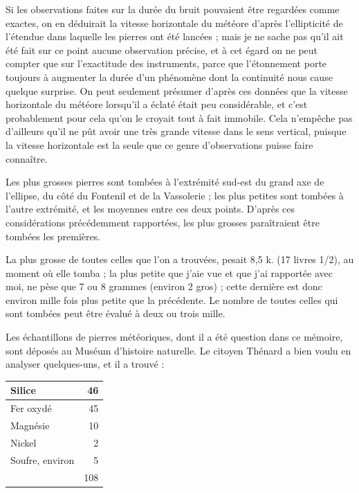 \documentclass[a4paper, 11pt, oneside, polutonikogreek, french]{article}
\begin{document}
Si les observations faites sur la durée du bruit pouvaient être regardées comme exactes, on en déduirait la vitesse horizontale du météore d'après l'ellipticité de l'étendue dans laquelle les pierres ont été lancées ; mais je ne sache pas qu'il ait été fait sur ce point aucune observation précise, et à cet égard on ne peut compter que sur l'exactitude des instruments, parce que l'étonnement porte toujours à augmenter la durée d'un phénomène dont la continuité nous cause quelque surprise. On peut seulement présumer d'après ces données que la vitesse horizontale du météore lorsqu'il a éclaté était peu considérable, et c'est probablement pour cela qu'on le croyait tout à fait immobile. Cela n'empêche pas d'ailleurs qu'il ne pût avoir une très grande vitesse dans le sens vertical, puisque la vitesse horizontale est la seule que ce genre d'observations puisse faire connaître.

Les plus grosses pierres sont tombées à l'extrémité sud-est du grand axe de l'ellipse, du côté du Fontenil et de la Vassolerie ; les plus petites sont tombées à l'autre extrémité, et les moyennes entre ces deux points. D'après ces considérations précédemment rapportées, les plus grosses paraîtraient être tombées les premières.

La plus grosse de toutes celles que l'on a trouvées, pesait 8,5 k. (17 livres 1/2), au moment où elle tomba ; la plus petite que j'aie vue et que j'ai rapportée avec moi, ne pèse que 7 ou 8 grammes (environ 2 gros) ; cette dernière est donc environ mille fois plus petite que la précédente. Le nombre de toutes celles qui sont tombées peut être évalué à deux ou trois mille.

Les échantillons de pierres météoriques, dont il a été question dans ce mémoire, sont déposés au Muséum d'histoire naturelle. Le citoyen Thénard a bien voulu en analyser quelques-uns, et il a trouvé :
\begin{table}[H]
    \centering\small
    \begin{tabular}{|l|r|}
    \hline
        Silice & 46 \\ \hline
        Fer oxydé & 45 \\ \hline
        Magnésie & 10 \\ \hline
        Nickel & 2 \\ \hline
        Soufre, environ & 5 \\ \hline
        ~ & 108 \\ \hline
    \end{tabular}
\end{table}
\end{document}
